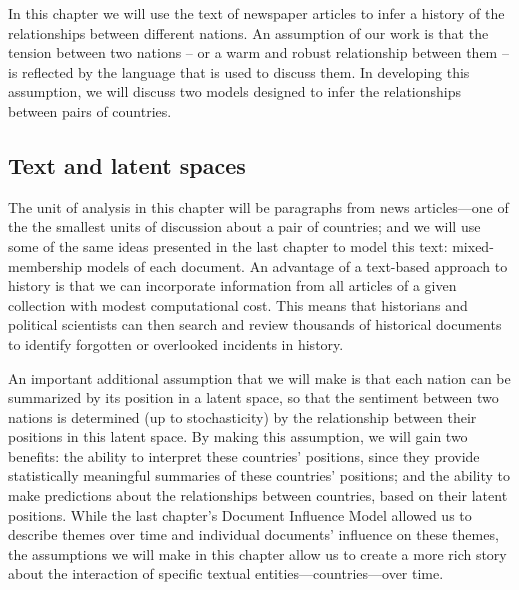 In this chapter we will use the text of newspaper articles to infer a
history of the relationships between different nations.  An assumption
of our work is that the tension between two nations -- or a warm and
robust relationship between them -- is reflected by the language that
is used to discuss them.  In developing this assumption, we will
discuss two models designed to infer the relationships between pairs
of countries.

\subsection*{Text and latent spaces}
The unit of analysis in this chapter will be paragraphs from news
articles---one of the the smallest units of discussion about a pair of
countries; and we will use some of the same ideas presented in the
last chapter to model this text: mixed-membership models of each
document.  An advantage of a text-based approach to history is that we
can incorporate information from all articles of a given collection
with modest computational cost.  This means that historians and
political scientists can then search and review thousands of
historical documents to identify forgotten or overlooked incidents in
history.

An important additional assumption that we will make is that each
nation can be summarized by its position in a latent space, so that
the sentiment between two nations is determined (up to stochasticity)
by the relationship between their positions in this latent space.  By
making this assumption, we will gain two benefits: the ability to
interpret these countries' positions, since they provide statistically
meaningful summaries of these countries' positions; and the ability to
make predictions about the relationships between countries, based on
their latent positions. While the last chapter's Document Influence
Model allowed us to describe themes over time and individual
documents' influence on these themes, the assumptions we will make in
this chapter allow us to create a more rich story about the
interaction of specific textual entities---countries---over time.



